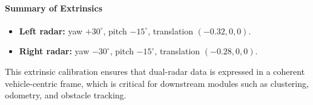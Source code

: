 \vspace{1em}

\paragraph{Summary of Extrinsics}
\begin{itemize}
    \item \textbf{Left radar:} yaw $+30^\circ$, pitch $-15^\circ$, translation $(-0.32, 0, 0)$.
    \item \textbf{Right radar:} yaw $-30^\circ$, pitch $-15^\circ$, translation $(-0.28, 0, 0)$.
\end{itemize}

This extrinsic calibration ensures that dual-radar data is expressed in a coherent vehicle-centric frame, which is critical for downstream modules such as clustering, odometry, and obstacle tracking.
